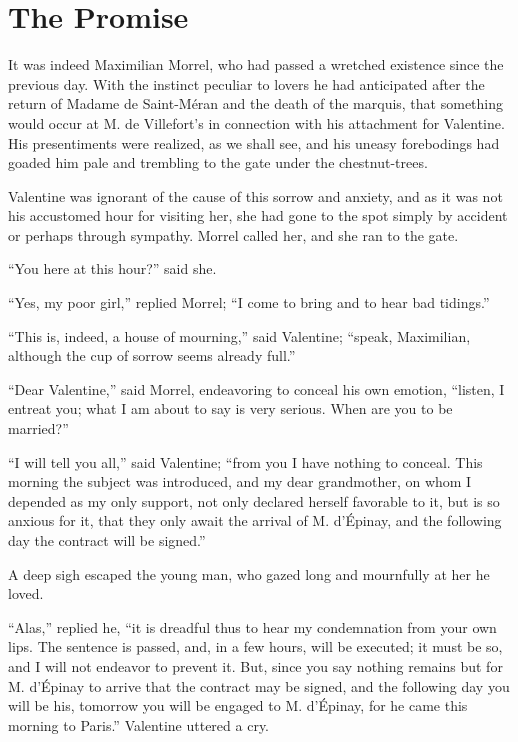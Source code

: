 \chapter{The Promise}

It was indeed Maximilian Morrel, who had passed a wretched existence
since the previous day. With the instinct peculiar to lovers he had
anticipated after the return of Madame de Saint-Méran and the death of
the marquis, that something would occur at M. de Villefort’s in
connection with his attachment for Valentine. His presentiments were
realized, as we shall see, and his uneasy forebodings had goaded him
pale and trembling to the gate under the chestnut-trees.

Valentine was ignorant of the cause of this sorrow and anxiety, and as
it was not his accustomed hour for visiting her, she had gone to the
spot simply by accident or perhaps through sympathy. Morrel called her,
and she ran to the gate.

“You here at this hour?” said she.

“Yes, my poor girl,” replied Morrel; “I come to bring and to hear bad
tidings.”

“This is, indeed, a house of mourning,” said Valentine; “speak,
Maximilian, although the cup of sorrow seems already full.”

“Dear Valentine,” said Morrel, endeavoring to conceal his own emotion,
“listen, I entreat you; what I am about to say is very serious. When
are you to be married?”

“I will tell you all,” said Valentine; “from you I have nothing to
conceal. This morning the subject was introduced, and my dear
grandmother, on whom I depended as my only support, not only declared
herself favorable to it, but is so anxious for it, that they only await
the arrival of M. d’Épinay, and the following day the contract will be
signed.”

A deep sigh escaped the young man, who gazed long and mournfully at her
he loved.

“Alas,” replied he, “it is dreadful thus to hear my condemnation from
your own lips. The sentence is passed, and, in a few hours, will be
executed; it must be so, and I will not endeavor to prevent it. But,
since you say nothing remains but for M. d’Épinay to arrive that the
contract may be signed, and the following day you will be his, tomorrow
you will be engaged to M. d’Épinay, for he came this morning to Paris.”
Valentine uttered a cry.


